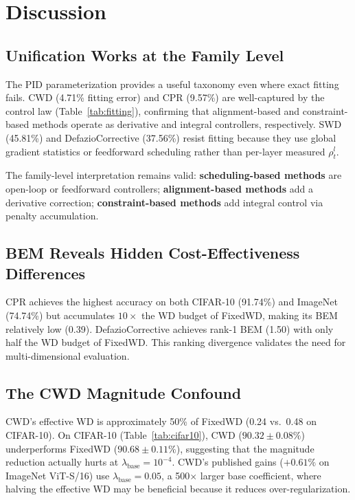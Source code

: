 \documentclass{article}
\begin{document}
\section{Discussion}
\label{sec:discussion}

\subsection{Unification Works at the Family Level}

The PID parameterization provides a useful taxonomy even where exact fitting fails. CWD (4.71\% fitting error) and CPR (9.57\%) are well-captured by the control law (Table~\ref{tab:fitting}), confirming that alignment-based and constraint-based methods operate as derivative and integral controllers, respectively. SWD (45.81\%) and DefazioCorrective (37.56\%) resist fitting because they use global gradient statistics or feedforward scheduling rather than per-layer measured $\rho_t^l$.

The family-level interpretation remains valid: \textbf{scheduling-based methods} are open-loop or feedforward controllers; \textbf{alignment-based methods} add a derivative correction; \textbf{constraint-based methods} add integral control via penalty accumulation.

\subsection{BEM Reveals Hidden Cost-Effectiveness Differences}

CPR achieves the highest accuracy on both CIFAR-10 (91.74\%) and ImageNet (74.74\%) but accumulates $10\times$ the WD budget of FixedWD, making its BEM relatively low (0.39). DefazioCorrective achieves rank-1 BEM (1.50) with only half the WD budget of FixedWD. This ranking divergence validates the need for multi-dimensional evaluation.

\subsection{The CWD Magnitude Confound}

CWD's effective WD is approximately 50\% of FixedWD (0.24 vs.\ 0.48 on CIFAR-10). On CIFAR-10 (Table~\ref{tab:cifar10}), CWD ($90.32 \pm 0.08\%$) underperforms FixedWD ($90.68 \pm 0.11\%$), suggesting that the magnitude reduction actually hurts at $\lambda_{\text{base}} = 10^{-4}$. CWD's published gains ($+0.61\%$ on ImageNet ViT-S/16) use $\lambda_{\text{base}} = 0.05$, a 500$\times$ larger base coefficient, where halving the effective WD may be beneficial because it reduces over-regularization.
\end{document}
